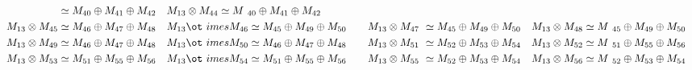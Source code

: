 \begin{align*}
{} \simeq M_{40} \oplus M_{41} \oplus M_{42} &&& M_{13} \otimes M_{44} \simeq M\
_{40} \oplus M_{41} \oplus M_{42}\\
M_{13} \otimes M_{45} \simeq M_{46} \oplus M_{47} \oplus M_{48} &&& M_{13} \ot\
imes M_{46} \simeq M_{45} \oplus M_{49} \oplus M_{50} &&& M_{13} \otimes M_{47\
} \simeq M_{45} \oplus M_{49} \oplus M_{50} &&& M_{13} \otimes M_{48} \simeq M\
_{45} \oplus M_{49} \oplus M_{50}\\
M_{13} \otimes M_{49} \simeq M_{46} \oplus M_{47} \oplus M_{48} &&& M_{13} \ot\
imes M_{50} \simeq M_{46} \oplus M_{47} \oplus M_{48} &&& M_{13} \otimes M_{51\
} \simeq M_{52} \oplus M_{53} \oplus M_{54} &&& M_{13} \otimes M_{52} \simeq M\
_{51} \oplus M_{55} \oplus M_{56}\\
M_{13} \otimes M_{53} \simeq M_{51} \oplus M_{55} \oplus M_{56} &&& M_{13} \ot\
imes M_{54} \simeq M_{51} \oplus M_{55} \oplus M_{56} &&& M_{13} \otimes M_{55\
} \simeq M_{52} \oplus M_{53} \oplus M_{54} &&& M_{13} \otimes M_{56} \simeq M\
_{52} \oplus M_{53} \oplus M_{54}\\
\end{align*}

